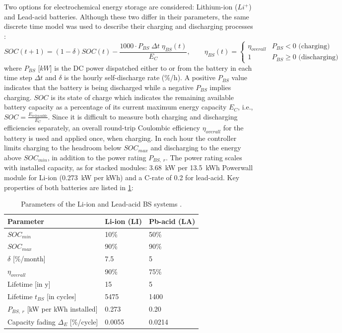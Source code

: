 \documentclass[final,3p,times]{elsarticle}
\begin{document}
Two options for electrochemical energy storage are considered: Lithium-ion ($Li^+$) and Lead-acid batteries. Although these two differ in their parameters, the same discrete time model was used to describe their charging and discharging processes \cite{tazvinga2014}:
\begin{equation}
    SOC(t+1) = (1-\delta) SOC(t) - \frac{1000 \cdot P_{BS} \; \Delta t \; \eta_{BS}(t)}{E_C}, \qquad \eta_{BS}(t) = \begin{cases} \eta_{overall} & P_{BS} < 0 \text{ (charging)} \\ 1 & P_{BS} \geq 0 \text{ (discharging)} \end{cases}
\end{equation}
where $P_{BS}$ [$kW$] is the DC power dispatched either to or from the battery in each time step $\Delta t$ and $\delta$ is the hourly self-discharge rate (\%/h). A positive $P_{BS}$ value indicates that the battery is being discharged while a negative $P_{BS}$ implies charging. $SOC$ is its state of charge which indicates the remaining available battery capacity as a percentage of its current maximum energy capacity $E_C$, i.e., $SOC = \frac{E_{releasable}}{E_C}$. Since it is difficult to measure both charging and discharging efficiencies separately, an overall round-trip Coulombic efficiency $\eta_{overall}$ for the battery is used and applied once, when charging. In each hour the controller limits charging to the headroom below $SOC_{max}$ and discharging to the energy above $SOC_{min}$, in addition to the power rating $P_{BS,\;r}$. The power rating scales with installed capacity, as for stacked modules: 3.68~kW per 13.5~kWh Powerwall module for Li-ion (0.273~kW per kWh) and a C-rate of 0.2 for lead-acid. Key properties of both batteries are listed in \cref{tab:bs_params}:

\begin{table}[htbp]
\centering
\begin{tabular}{@{}lll@{}}
\toprule
\textbf{Parameter}               & \textbf{Li-ion (LI)} & \textbf{Pb-acid (LA)} \\ \midrule
$SOC_{min}$                         & 10\%            & 50\%             \\
$SOC_{max}$                         & 90\%            & 90\%             \\
$\delta$ [\%/month] & 7.5             & 5                \\
$\eta_{overall}$     & 90\%            & 75\%               \\
Lifetime [in y]                  & 15              & 5                \\
Lifetime $t_{BS}$ [in cycles]             & 5475            & 1400             \\
$P_{BS, \; r}$ [kW per kWh installed]  & 0.273           & 0.20             \\
Capacity fading $\Delta_E$ [\%/cycle]       & 0.0055          & 0.0214           \\ \bottomrule
\end{tabular}
\caption{Parameters of the Li-ion and Lead-acid BS systems \cite{bs_source}.}
\label{tab:bs_params} 
\end{table}
\end{document}
